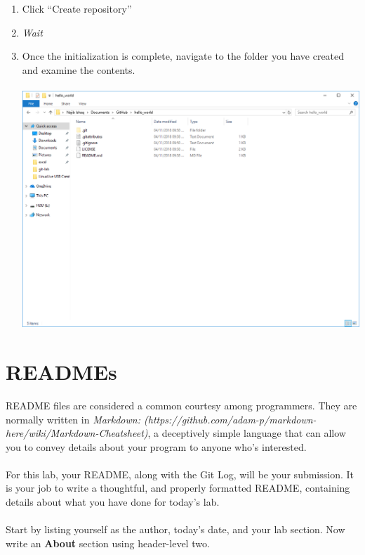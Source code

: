 \documentclass[12pt, letter]{article}
\begin{document}
\begin{enumerate}
\begin{enumerate}
        \end{enumerate}

        \item Click ``Create repository''

        \item \emph{Wait}

        \item Once the initialization is complete, navigate to the folder you have created and examine the contents. \\ \\

        \includegraphics{screenshots/shot3.bmp}
    \end{enumerate} 

    \section{READMEs}
    README files are considered a common courtesy among programmers. They are normally written in \emph{Markdown: (https://github.com/adam-p/markdown-here/wiki/Markdown-Cheatsheet)}, a deceptively simple language that can allow you to convey details about your program to anyone who's interested. 
    \\ \\
    For this lab, your README, along with the Git Log, will be your submission. It is your job to write a thoughtful, and properly formatted README, containing details about what you have done for today's lab.
    \\ \\ 
    Start by listing yourself as the author, today's date, and your lab section. Now write an \textbf{About} section using header-level two. 
\end{document}
